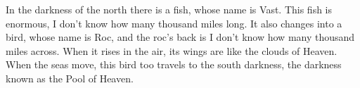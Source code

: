 \documentclass{zettlekasten}
\begin{document}
In the darkness of the north there is a fish, whose name is Vast.
This fish is enormous, I don’t know how many thousand miles long.
It also changes into a bird, whose name is Roc, and the roc’s back is I don’t know how many thousand miles across.
When it rises in the air, its wings are like the clouds of Heaven.
When the seas move, this bird too travels to the south darkness, the darkness known as the Pool of Heaven.
\end{document}
